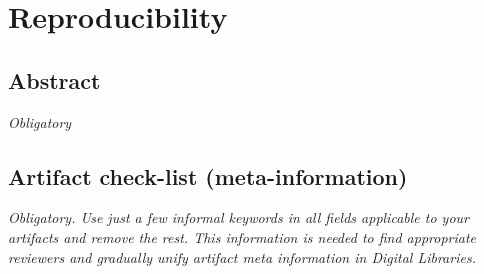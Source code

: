

\ifpdf
    \graphicspath{{10_appendix/figures/PNG/}{10_appendix/figures/PDF/}{10_appendix/figures/}}
\else
    \graphicspath{{10_appendix/figures/EPS/}{10_appendix/figures/}}
\fi


\chapter{Reproducibility}
\section{Abstract}

{\em Obligatory}

\section{Artifact check-list (meta-information)}

{\em Obligatory. Use just a few informal keywords in all fields applicable to your artifacts
and remove the rest. This information is needed to find appropriate reviewers and gradually 
unify artifact meta information in Digital Libraries.}

